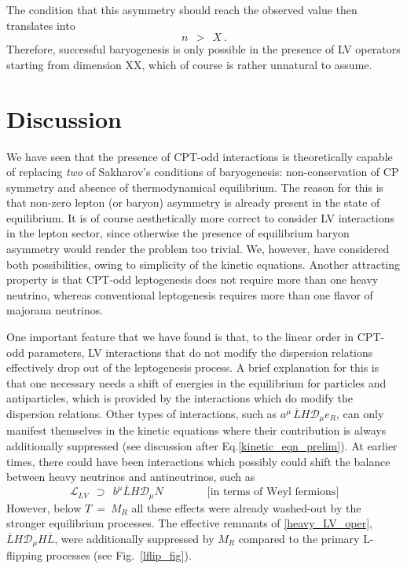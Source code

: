 \documentclass[12pt]{revtex4}
\newcommand{\md}{\mathcal{D}}
\newcommand{\ov}{\overline}
\begin{document}
	The condition that this asymmetry should reach the observed value then translates
	into
\[
	n~~>~~X~.
\]
	Therefore, successful baryogenesis is only possible in the presence of LV operators
	starting from dimension XX, which of course is rather 
	unnatural to assume.


%
%
\section{Discussion}

	We have seen that the presence of CPT-odd interactions is theoretically capable
	of replacing \emph{two} of Sakharov's conditions of baryogenesis: non-conservation 
	of CP symmetry and absence of thermodynamical equilibrium. 
	The reason for this is that non-zero lepton (or baryon) asymmetry is already present 
	in the state of equilibrium.
	It is of course aesthetically more correct to consider LV interactions in the 
	lepton sector,
	since otherwise the presence of equilibrium baryon asymmetry would render the 
	problem too trivial.
	We, however, have considered both possibilities, owing to  simplicity of the kinetic
	equations.
	Another attracting property is that CPT-odd leptogenesis does not require more than
	one heavy neutrino, whereas conventional leptogenesis requires more than one flavor
	of majorana neutrinos.

	One important feature that we have found is that, to the linear order in CPT-odd 
	parameters, LV interactions that do not modify the dispersion relations effectively 
	drop out of the leptogenesis process.
	A brief explanation for this is that one necessary needs a shift of energies
	in the equilibrium for particles and antiparticles, which is provided by the 
	interactions which do modify the dispersion relations. 
	Other types of interactions, such as $ a^\mu\, \ov{L}H \md_\mu e_R $,
	can only manifest themselves in the kinetic equations where their contribution
	is always additionally suppressed 
	(see discussion after Eq.\eqref{kinetic_eqn_prelim}).
	At earlier times, there could have been interactions which possibly could 
	shift the balance between heavy neutrinos and antineutrinos, such as 
\begin{equation}
\label{heavy_LV_oper}
	\mathcal{L}_{LV} ~~\supset~~
	 b^\mu \ov{L} H \md_\mu N \qquad\qquad \text{[in terms of Weyl fermions]}
\end{equation}
	However, below $ T ~=~ M_R $ all these effects
	were already washed-out by the stronger equilibrium processes.
	The effective remnants of \eqref{heavy_LV_oper}, $ \ov{L}H \md_\mu H \ov{L} $, 
	were additionally suppressed by $ M_R $ compared to the primary L-flipping processes
	(see Fig.~\ref{lflip_fig}).
	
\end{document}
